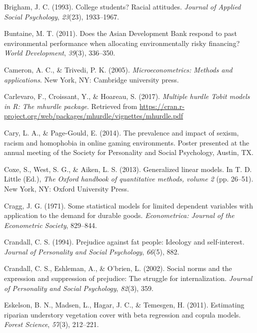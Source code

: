 \documentclass[english,man]{apa6}
\theoremstyle{definition}
\theoremstyle{definition}
\theoremstyle{remark}
\begin{document}
\setlength{\parindent}{-0.5in} \setlength{\leftskip}{0.5in}

\hypertarget{refs}{}
\hypertarget{ref-brigham1993college}{}
Brigham, J. C. (1993). College students? Racial attitudes. \emph{Journal
of Applied Social Psychology}, \emph{23}(23), 1933--1967.

\hypertarget{ref-buntaine2011does}{}
Buntaine, M. T. (2011). Does the Asian Development Bank respond to past
environmental performance when allocating environmentally risky
financing? \emph{World Development}, \emph{39}(3), 336--350.

\hypertarget{ref-cameron2005microeconometrics}{}
Cameron, A. C., \& Trivedi, P. K. (2005). \emph{Microeconometrics:
Methods and applications}. New York, NY: Cambridge university press.

\hypertarget{ref-carlevaro2016multiple}{}
Carlevaro, F., Croissant, Y., \& Hoareau, S. (2017). \emph{Multiple
hurdle Tobit models in R: The mhurdle package}. Retrieved from
\url{https://cran.r-project.org/web/packages/mhurdle/vignettes/mhurdle.pdf}

\hypertarget{ref-cary2014prevalence}{}
Cary, L. A., \& Page-Gould, E. (2014). The prevalence and impact of
sexism, racism and homophobia in online gaming environments. Poster
presented at the annual meeting of the Society for Personality and
Social Psychology, Austin, TX.

\hypertarget{ref-coxe2013generalized}{}
Coxe, S., West, S. G., \& Aiken, L. S. (2013). Generalized linear
models. In T. D. Little (Ed.), \emph{The Oxford handbook of quantitative
methods, volume 2} (pp. 26--51). New York, NY: Oxford University Press.

\hypertarget{ref-cragg1971some}{}
Cragg, J. G. (1971). Some statistical models for limited dependent
variables with application to the demand for durable goods.
\emph{Econometrica: Journal of the Econometric Society}, 829--844.

\hypertarget{ref-crandall1994prejudice}{}
Crandall, C. S. (1994). Prejudice against fat people: Ideology and
self-interest. \emph{Journal of Personality and Social Psychology},
\emph{66}(5), 882.

\hypertarget{ref-crandall2002social}{}
Crandall, C. S., Eshleman, A., \& O'brien, L. (2002). Social norms and
the expression and suppression of prejudice: The struggle for
internalization. \emph{Journal of Personality and Social Psychology},
\emph{82}(3), 359.

\hypertarget{ref-eskelson2011estimating}{}
Eskelson, B. N., Madsen, L., Hagar, J. C., \& Temesgen, H. (2011).
Estimating riparian understory vegetation cover with beta regression and
copula models. \emph{Forest Science}, \emph{57}(3), 212--221.
\end{document}
